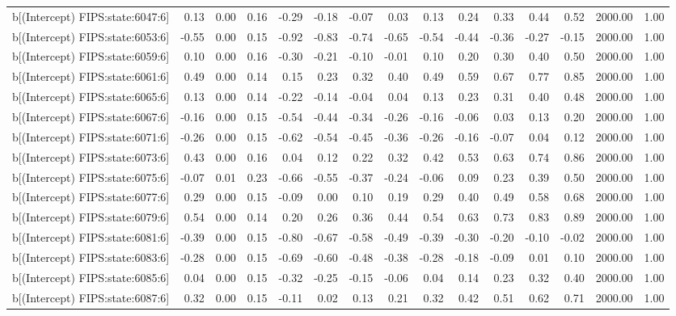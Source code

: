 \begin{table}[ht]
\begin{tabular}{rrrrrrrrrrrrrrr}
  b[(Intercept) FIPS:state:6047:6] & 0.13 & 0.00 & 0.16 & -0.29 & -0.18 & -0.07 & 0.03 & 0.13 & 0.24 & 0.33 & 0.44 & 0.52 & 2000.00 & 1.00 \\ 
  b[(Intercept) FIPS:state:6053:6] & -0.55 & 0.00 & 0.15 & -0.92 & -0.83 & -0.74 & -0.65 & -0.54 & -0.44 & -0.36 & -0.27 & -0.15 & 2000.00 & 1.00 \\ 
  b[(Intercept) FIPS:state:6059:6] & 0.10 & 0.00 & 0.16 & -0.30 & -0.21 & -0.10 & -0.01 & 0.10 & 0.20 & 0.30 & 0.40 & 0.50 & 2000.00 & 1.00 \\ 
  b[(Intercept) FIPS:state:6061:6] & 0.49 & 0.00 & 0.14 & 0.15 & 0.23 & 0.32 & 0.40 & 0.49 & 0.59 & 0.67 & 0.77 & 0.85 & 2000.00 & 1.00 \\ 
  b[(Intercept) FIPS:state:6065:6] & 0.13 & 0.00 & 0.14 & -0.22 & -0.14 & -0.04 & 0.04 & 0.13 & 0.23 & 0.31 & 0.40 & 0.48 & 2000.00 & 1.00 \\ 
  b[(Intercept) FIPS:state:6067:6] & -0.16 & 0.00 & 0.15 & -0.54 & -0.44 & -0.34 & -0.26 & -0.16 & -0.06 & 0.03 & 0.13 & 0.20 & 2000.00 & 1.00 \\ 
  b[(Intercept) FIPS:state:6071:6] & -0.26 & 0.00 & 0.15 & -0.62 & -0.54 & -0.45 & -0.36 & -0.26 & -0.16 & -0.07 & 0.04 & 0.12 & 2000.00 & 1.00 \\ 
  b[(Intercept) FIPS:state:6073:6] & 0.43 & 0.00 & 0.16 & 0.04 & 0.12 & 0.22 & 0.32 & 0.42 & 0.53 & 0.63 & 0.74 & 0.86 & 2000.00 & 1.00 \\ 
  b[(Intercept) FIPS:state:6075:6] & -0.07 & 0.01 & 0.23 & -0.66 & -0.55 & -0.37 & -0.24 & -0.06 & 0.09 & 0.23 & 0.39 & 0.50 & 2000.00 & 1.00 \\ 
  b[(Intercept) FIPS:state:6077:6] & 0.29 & 0.00 & 0.15 & -0.09 & 0.00 & 0.10 & 0.19 & 0.29 & 0.40 & 0.49 & 0.58 & 0.68 & 2000.00 & 1.00 \\ 
  b[(Intercept) FIPS:state:6079:6] & 0.54 & 0.00 & 0.14 & 0.20 & 0.26 & 0.36 & 0.44 & 0.54 & 0.63 & 0.73 & 0.83 & 0.89 & 2000.00 & 1.00 \\ 
  b[(Intercept) FIPS:state:6081:6] & -0.39 & 0.00 & 0.15 & -0.80 & -0.67 & -0.58 & -0.49 & -0.39 & -0.30 & -0.20 & -0.10 & -0.02 & 2000.00 & 1.00 \\ 
  b[(Intercept) FIPS:state:6083:6] & -0.28 & 0.00 & 0.15 & -0.69 & -0.60 & -0.48 & -0.38 & -0.28 & -0.18 & -0.09 & 0.01 & 0.10 & 2000.00 & 1.00 \\ 
  b[(Intercept) FIPS:state:6085:6] & 0.04 & 0.00 & 0.15 & -0.32 & -0.25 & -0.15 & -0.06 & 0.04 & 0.14 & 0.23 & 0.32 & 0.40 & 2000.00 & 1.00 \\ 
  b[(Intercept) FIPS:state:6087:6] & 0.32 & 0.00 & 0.15 & -0.11 & 0.02 & 0.13 & 0.21 & 0.32 & 0.42 & 0.51 & 0.62 & 0.71 & 2000.00 & 1.00 \\ 

\end{tabular}
\end{table}
